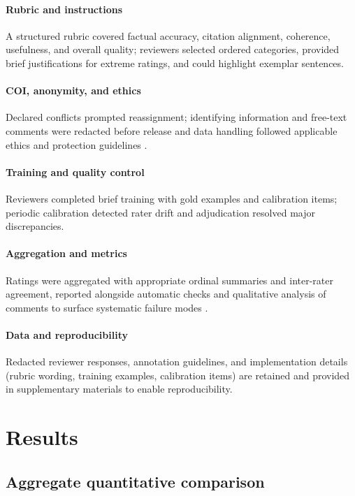 \documentclass{article}%
\begin{document}
\paragraph{Rubric and instructions} A structured rubric covered factual accuracy, citation alignment, coherence, usefulness, and overall quality; reviewers selected ordered categories, provided brief justifications for extreme ratings, and could highlight exemplar sentences.

\paragraph{COI, anonymity, and ethics} Declared conflicts prompted reassignment; identifying information and free-text comments were redacted before release and data handling followed applicable ethics and protection guidelines \cite{web_human_2022_advanced_data_protection_control_adpc_an_interdi}.

\paragraph{Training and quality control} Reviewers completed brief training with gold examples and calibration items; periodic calibration detected rater drift and adjudication resolved major discrepancies.

\paragraph{Aggregation and metrics} Ratings were aggregated with appropriate ordinal summaries and inter-rater agreement, reported alongside automatic checks and qualitative analysis of comments to surface systematic failure modes \cite{web_ray_2019_can_you_explain_that_lucid_explanations_help_hum}.

\paragraph{Data and reproducibility} Redacted reviewer responses, annotation guidelines, and implementation details (rubric wording, training examples, calibration items) are retained and provided in supplementary materials to enable reproducibility.%

%
\section{Results}%
\subsection{Aggregate quantitative comparison}%
\end{document}
